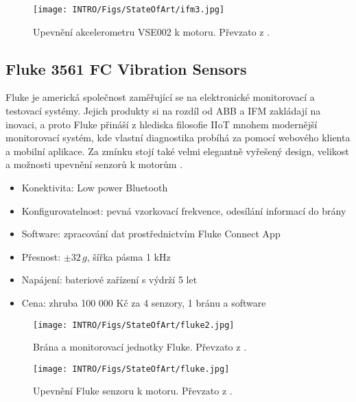        
       \begin{figure}[!htp]
            \centering
            \texttt{[image: INTRO/Figs/StateOfArt/ifm3.jpg]}
            \caption {Upevnění akcelerometru VSE002 k motoru. Převzato z \cite{manufactor:2}.}
        \end{figure}
    
    
    \subsection{Fluke 3561 FC Vibration Sensors}
        Fluke je americká společnost zaměřující se na elektronické monitorovací a testovací systémy. Jejich produkty si na rozdíl od ABB a IFM zakládají na inovaci, a proto Fluke přináší z hlediska filosofie IIoT mnohem modernější monitorovací systém, kde vlastní diagnostika probíhá za pomocí webového klienta a mobilní aplikace. Za zmínku stojí také velmi elegantně vyřešený design, velikost a možnosti upevnění senzorů k motorům \cite{manufactor:3}.
        
     
        
        \begin{itemize}
            \item Konektivita: Low power Bluetooth 
            \item Konfigurovatelnost: pevná vzorkovací frekvence, odesílání informací do brány
            \item Software: zpracování dat prostřednictvím Fluke Connect App
            \item Přesnost: $\pm 32\,g$, šířka pásma 1 kHz
            \item Napájení: bateriové zařízení s výdrží 5 let
            \item Cena: zhruba 100 000 Kč za 4 senzory, 1 bránu a software
        \end{itemize}{}
        
          \begin{figure} [!htp]
            \centering
            \texttt{[image: INTRO/Figs/StateOfArt/fluke2.jpg]}
            \caption {Brána a monitorovací jednotky Fluke. Převzato z \cite{manufactor:3}.}
        \end{figure}
    
        
        \begin{figure}[H]
            \centering
            \texttt{[image: INTRO/Figs/StateOfArt/fluke.jpg]}
            \caption {Upevnění Fluke senzoru k motoru. Převzato z \cite{manufactor:3}.}
        \end{figure}

